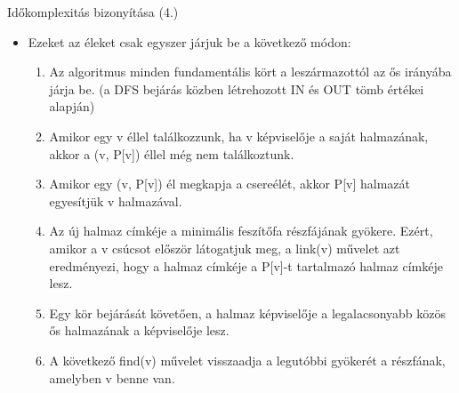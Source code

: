 \begin{frame}{Időkomplexitás bizonyítása (4.)}
  \begin{itemize}
    \item Ezeket az éleket csak egyszer járjuk be a következő módon:
    \begin{enumerate}
      \item Az algoritmus minden fundamentális kört a leszármazottól az ős irányába járja be. (a DFS bejárás közben létrehozott IN és OUT tömb értékei alapján)
      
      \item Amikor egy v éllel találkozzunk, ha v képviselője a saját halmazának, akkor a (v, P[v]) éllel még nem találkoztunk. %
      
      \item Amikor egy (v, P[v]) él megkapja a csereélét, akkor P[v] halmazát egyesítjük v halmazával.
      
      \item Az új halmaz címkéje a minimális feszítőfa részfájának gyökere. Ezért, amikor a v csúcsot először látogatjuk meg, a link(v) művelet azt eredményezi, hogy a halmaz címkéje a P[v]-t tartalmazó halmaz címkéje lesz.
      
      \item Egy kör bejárását követően, a halmaz képviselője a legalacsonyabb közös ős halmazának a képviselője lesz.
      
      \item A következő find(v) művelet visszaadja a legutóbbi gyökerét a részfának, amelyben v benne van.
      

\end{enumerate}
\end{itemize}
\end{frame}
